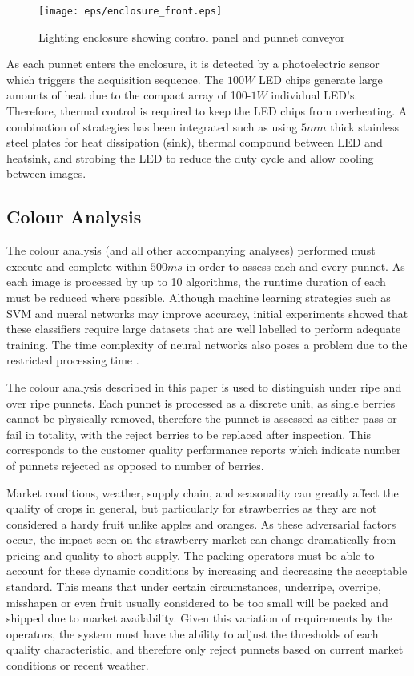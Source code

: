 \documentclass[conference]{IEEEtran}
\begin{document}
\begin{figure}[h]
	\centering
	\texttt{[image: eps/enclosure\_front.eps]}
	\caption{Lighting enclosure showing control panel and punnet conveyor}
	\label{fig:enclosure_front}
\end{figure}


As each punnet enters the enclosure, it is detected by a photoelectric sensor which triggers the acquisition sequence. The $100W$ LED chips generate large amounts of heat due to the compact array of 100-$1W$ individual LED's. Therefore, thermal control is required to keep the LED chips from overheating. A combination of strategies has been integrated such as using $5mm$ thick stainless steel plates for heat dissipation (sink), thermal compound between LED and heatsink, and strobing the LED to reduce the duty cycle and allow cooling between images.   



\subsection{Colour Analysis}
\label{sec:colour_analysis}

The colour analysis (and all other accompanying analyses) performed must execute and complete within $500ms$ in order to assess each and every punnet. As each image is processed by up to 10 algorithms, the runtime duration of each must be reduced where possible. Although machine learning strategies such as SVM and nueral networks may improve accuracy, initial experiments showed that these classifiers require large datasets that are well labelled to perform adequate training. The time complexity of neural networks also poses a problem due to the restricted processing time \cite{he}\cite{angiulli}. 

The colour analysis described in this paper is used to distinguish under ripe and over ripe punnets. Each punnet is processed as a discrete unit, as single berries cannot be physically removed, therefore the punnet is assessed as either pass or fail in totality, with the reject berries to be replaced after inspection. This corresponds to the customer quality performance reports which indicate number of punnets rejected as opposed to number of berries. 

Market conditions, weather, supply chain, and seasonality can greatly affect the quality of crops in general, but particularly for strawberries as they are not considered a hardy fruit unlike apples and oranges. As these adversarial factors occur, the impact seen on the strawberry market can change dramatically from pricing and quality to short supply. The packing operators must be able to account for these dynamic conditions by increasing and decreasing the acceptable standard. This means that under certain circumstances, underripe, overripe, misshapen or even fruit usually considered to be too small will be packed and shipped due to market availability. Given this variation of requirements by the operators, the system must have the ability to adjust the thresholds of each quality characteristic, and therefore only reject punnets based on current market conditions or recent weather. 
\end{document}
